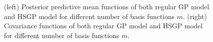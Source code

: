 \documentclass[]{interact}
\theoremstyle{plain}%
\theoremstyle{definition}
\theoremstyle{remark}
\begin{document}
\begin{figure}
\caption{(left) Posterior predictive mean functions of both regular GP model and HSGP model for different number of basis functions $m$. (right) Covariance functions of both regular GP model and HSGP model for different number of basis functions $m$.}
  \label{fig1_Post_J}
\end{figure}
\end{document}
